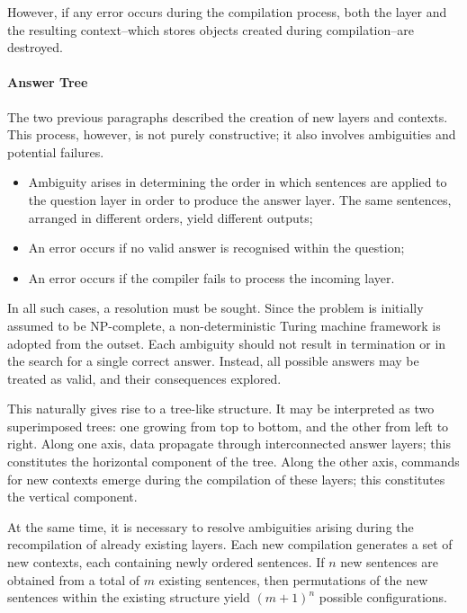 \documentclass[12pt, a4paper]{article}
\begin{document}
However, if any error occurs during the compilation process, both the layer and the 
resulting context--which stores objects created during compilation--are destroyed.

\paragraph{Answer Tree}

The two previous paragraphs described the creation of new layers and contexts. This 
process, however, is not purely constructive; it also involves ambiguities and 
potential failures.

\begin{itemize}
\item Ambiguity arises in determining the order in which sentences are applied to 
the question layer in order to produce the answer layer. The same sentences, arranged 
in different orders, yield different outputs;
\item An error occurs if no valid answer is recognised within the question;
\item An error occurs if the compiler fails to process the incoming layer.
\end{itemize}

In all such cases, a resolution must be sought. Since the problem is initially assumed to 
be NP-complete, a non-deterministic Turing machine framework is adopted from the outset. 
Each ambiguity should not result in termination or in the search for a single correct 
answer. Instead, all possible answers may be treated as valid, and their consequences explored.

This naturally gives rise to a tree-like structure. It may be interpreted as two superimposed 
trees: one growing from top to bottom, and the other from left to right. Along one axis, 
data propagate through interconnected answer layers; this constitutes the horizontal component 
of the tree. Along the other axis, commands for new contexts emerge during the compilation 
of these layers; this constitutes the vertical component.

At the same time, it is necessary to resolve ambiguities arising during the recompilation of 
already existing layers. Each new compilation generates a set of new contexts, each containing 
newly ordered sentences. If $n$ new sentences are obtained from a total of $m$ existing sentences,
then permutations of the new sentences within the existing structure yield $(m+1)^n$ possible 
configurations.
\end{document}
